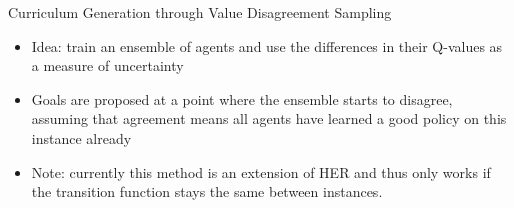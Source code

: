 \begin{frame}[c]{Curriculum Generation through Value Disagreement Sampling~}
	
	\begin{itemize}
		\item Idea: train an ensemble of agents and use the differences in their Q-values as a measure of uncertainty
		\item Goals are proposed at a point where the ensemble starts to disagree, assuming that agreement means all agents have learned a good policy on this instance already
		\item Note: currently this method is an extension of HER and thus only works if the transition function stays the same between instances. 
	\end{itemize}
	
\end{frame}

